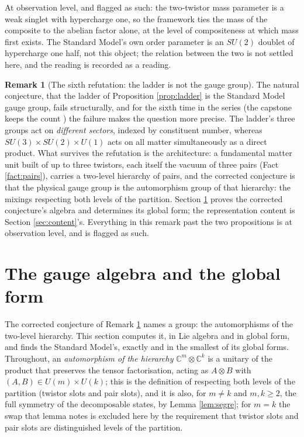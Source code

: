 \documentclass[11pt]{article}
\theoremstyle{definition}
\newtheorem{remark}[theorem]{Remark}
\newcommand{\C}{\mathbb{C}}
\begin{document}
At observation level, and flagged as such: the two-twistor mass parameter is a weak singlet with hypercharge one, so the framework ties the mass of the composite to the abelian factor alone, at the level of compositeness at which mass first exists. The Standard Model's own order parameter is an $SU(2)$ doublet of hypercharge one half, not this object; the relation between the two is not settled here, and the reading is recorded as a reading.

\begin{remark}[The sixth refutation: the ladder is not the gauge group]\label{rem:sixth}
The natural conjecture, that the ladder of Proposition \ref{prop:ladder} is the Standard Model gauge group, fails structurally, and for the sixth time in the series (the capstone keeps the count \cite{ButlerT17}) the failure makes the question more precise. The ladder's three groups act on \emph{different sectors}, indexed by constituent number, whereas $SU(3) \times SU(2) \times U(1)$ acts on all matter simultaneously as a direct product. What survives the refutation is the architecture: a fundamental matter unit built of up to three twistors, each itself the vacuum of three pairs (Fact \ref{fact:pairs}), carries a two-level hierarchy of pairs, and the corrected conjecture is that the physical gauge group is the automorphism group of that hierarchy: the mixings respecting both levels of the partition. Section \ref{sec:algebra} proves the corrected conjecture's algebra and determines its global form; the representation content is Section \ref{sec:content}'s. Everything in this remark past the two propositions is at observation level, and is flagged as such.
\end{remark}

\section{The gauge algebra and the global form}\label{sec:algebra}

The corrected conjecture of Remark \ref{rem:sixth} names a group: the automorphisms of the two-level hierarchy. This section computes it, in Lie algebra and in global form, and finds the Standard Model's, exactly and in the smallest of its global forms. Throughout, an \emph{automorphism of the hierarchy} $\C^{m} \otimes \C^{k}$ is a unitary of the product that preserves the tensor factorisation, acting as $A \otimes B$ with $(A, B) \in U(m) \times U(k)$; this is the definition of respecting both levels of the partition (twistor slots and pair slots), and it is also, for $m \neq k$ and $m, k \ge 2$, the full symmetry of the decomposable states, by Lemma \ref{lem:segre}; for $m = k$ the swap that lemma notes is excluded here by the requirement that twistor slots and pair slots are distinguished levels of the partition.
\end{document}
